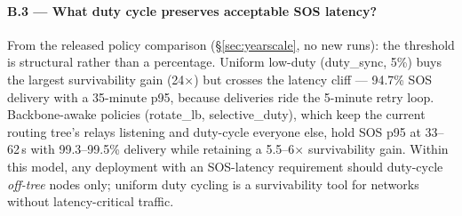 \documentclass[11pt]{article}
\begin{document}
\paragraph{B.3 --- What duty cycle preserves acceptable SOS latency?}
From the released policy comparison (\S\ref{sec:yearscale}, no new runs): the
threshold is structural rather than a percentage. Uniform low-duty
(duty\_sync, 5\%) buys the largest survivability gain (24$\times$) but
crosses the latency cliff --- 94.7\% SOS delivery with a 35-minute p95,
because deliveries ride the 5-minute retry loop. Backbone-awake policies
(rotate\_lb, selective\_duty), which keep the current routing tree's relays
listening and duty-cycle everyone else, hold SOS p95 at 33--62\,s with
99.3--99.5\% delivery while retaining a 5.5--6$\times$ survivability gain.
Within this model, any deployment with an SOS-latency requirement should
duty-cycle \emph{off-tree} nodes only; uniform duty cycling is a
survivability tool for networks without latency-critical traffic.
\end{document}
